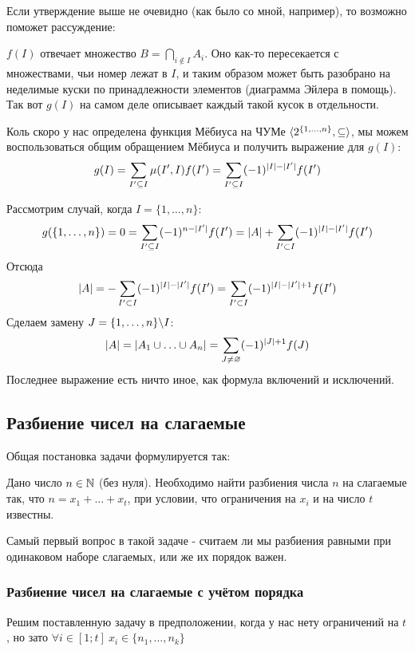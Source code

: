 \begin{anote}
	Если утверждение выше не очевидно (как было со мной, например), то возможно поможет рассуждение:
	
	$f(I)$ отвечает множество $B = \bigcap\limits_{i \notin I} A_i$. Оно как-то пересекается с множествами, чьи номер лежат в $I$, и таким образом может быть разобрано на неделимые куски по принадлежности элементов (диаграмма Эйлера в помощь). Так вот $g(I)$ на самом деле описывает каждый такой кусок в отдельности.
\end{anote}

Коль скоро у нас определена функция Мёбиуса на ЧУМе $\langle2^{\{1, \ldots, n\}}, \subseteq\rangle$, мы можем воспользоваться общим обращением Мёбиуса и получить выражение для $g(I)$:
\[
	g(I) = \sum\limits_{I' \subseteq I} \mu(I', I) f(I') = \sum\limits_{I' \subseteq I} (-1)^{|I| - |I'|} f(I')
\]

Рассмотрим случай, когда $I = \{1, \ldots, n\}$:
\[
	g(\{1, \ldots, n\}) = 0 = \sum\limits_{I' \subseteq I} (-1)^{n - |I'|} f(I') = |A| + \sum\limits_{I' \subset I} (-1)^{|I| - |I'|} f(I')
\]
Отсюда
\[
	|A| = -\sum\limits_{I' \subset I} (-1)^{|I| - |I'|} f(I') = \sum\limits_{I' \subset I} (-1)^{|I| - |I'| + 1} f(I')
\]
Сделаем замену $J = \{1, \ldots, n\} \backslash I$:
\[
	|A| = |A_1 \cup \ldots \cup A_n| = \sum\limits_{J \neq \varnothing} (-1)^{|J| + 1} f(J)
\]
Последнее выражение есть ничто иное, как формула включений и исключений.

\subsection{Разбиение чисел на слагаемые}

Общая постановка задачи формулируется так:

Дано число $n \in \mathbb{N}$ (без нуля). Необходимо найти разбиения числа $n$ на слагаемые так, что $n = x_1 + \ldots + x_t$, при условии, что ограничения на $x_i$ и на число $t$ известны.

Самый первый вопрос в такой задаче - считаем ли мы разбиения равными при одинаковом наборе слагаемых, или же их порядок важен.

\subsubsection*{Разбиение чисел на слагаемые с учётом порядка}

Решим поставленную задачу в предположении, когда у нас нету ограничений на $t$, но зато $\forall i \in [1; t]\ x_i \in \{n_1, \ldots, n_k\}$

